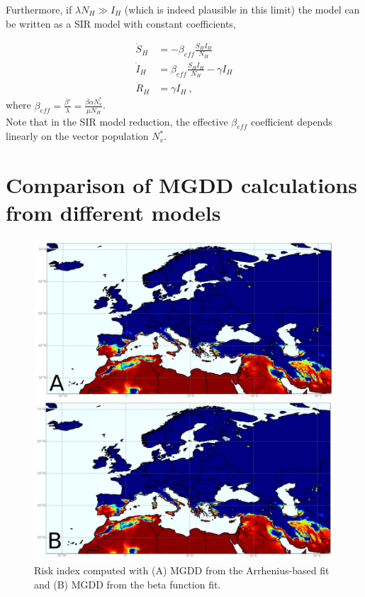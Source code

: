 Furthermore, if $\lambda N_H \gg I_H$ (which is indeed plausible in this
limit) the model can be written as a SIR model with constant coefficients,

\begin{equation}\label{eq:SIR}
    \begin{aligned}
        \dot{S}_H & =-\beta_{eff}\frac{S_HI_H}{N_H}            \\
        \dot{I}_H & =\beta_{eff}\frac{S_HI_H}{N_H}- \gamma I_H \\
        \dot{R}_H & =\gamma I_H \ ,
    \end{aligned}
\end{equation}
where $\displaystyle\beta_{eff}=\frac{\beta'}{\lambda}=\frac{\beta\alpha
        N_v^*}{\mu N_H}$.\\

Note that in the SIR model reduction, the effective $\beta_{eff}$
coefficient depends linearly on the vector population $N_v^*$.

\section{Comparison of MGDD calculations from different models}

\begin{figure}[H]
    \centering
    \includegraphics[width=\textwidth]{Figures/Risk_risk_beta.png}
    \caption[Comparison of Arrhenius-based vs beta function to define
        MGDD]{Risk index computed with
        (A) MGDD from the Arrhenius-based fit and
        (B) MGDD from the beta function fit.}
    \label{fig:R2} %
\end{figure}

